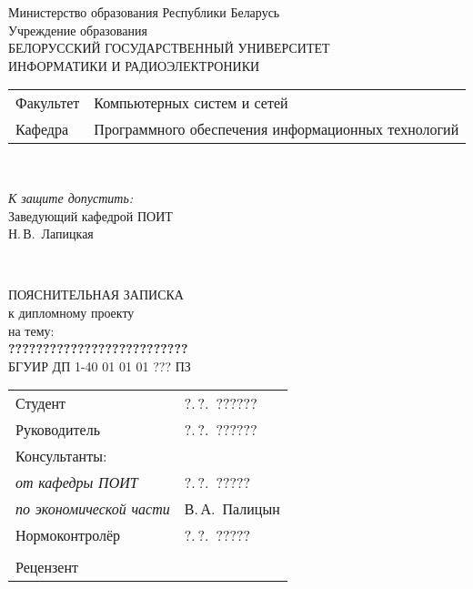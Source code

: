 \begin{titlepage}
  \begin{center}
    Министерство образования Республики Беларусь\\[1em]
    Учреждение образования\\
    БЕЛОРУССКИЙ ГОСУДАРСТВЕННЫЙ УНИВЕРСИТЕТ \\
    ИНФОРМАТИКИ И РАДИОЭЛЕКТРОНИКИ\\[1em]

    \begin{minipage}{\textwidth}
      \begin{flushleft}
        \begin{tabular}{ l l }
          Факультет & Компьютерных систем и сетей\\
          Кафедра   & Программного обеспечения информационных технологий
        \end{tabular}
      \end{flushleft}
    \end{minipage}\\[1em]

    \begin{flushright}
      \begin{minipage}{0.4\textwidth}
        \textit{К защите допустить:}\\[0.8em]
        Заведующий кафедрой ПОИТ\\[0.45em]
        \underline{\hspace*{2.8cm}} Н.\,В.~Лапицкая
      \end{minipage}\\[2.2em]
    \end{flushright}

    {ПОЯСНИТЕЛЬНАЯ ЗАПИСКА}\\
    {к дипломному проекту}\\
    {на тему:}\\[1em]
    \textbf{\large ??????????????????????????}\\[1em]


    {БГУИР ДП 1-40 01 01 01 ??? ПЗ}\\[2em]
    
    \begin{tabular}{ p{}p{} }
      Студент & ?.\,?.~?????? \\
      Руководитель & ?.\,?.~?????? \\
      Консультанты: &\\
      \hspace*{3ex}\emph{от кафедры ПОИТ} & ?.\,?.~????? \\
      \hspace*{3ex}\emph{по экономической части} & В.\,А.~Палицын \\
      Нормоконтролёр & ?.\,?.~?????\\
      & \\
      Рецензент &
    \end{tabular}
    

\end{center}
\end{titlepage}
